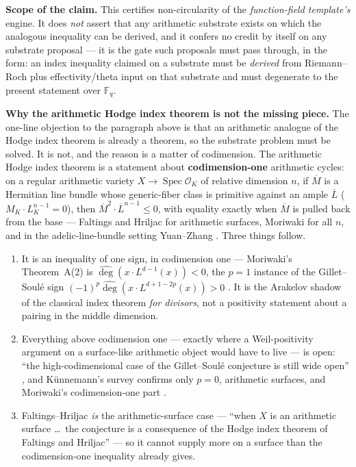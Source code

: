 \documentclass[11pt]{article}
\theoremstyle{definition}
\theoremstyle{remark}
\newcommand{\Fq}{\mathbb{F}_q}
\begin{document}
\medskip

\noindent\textbf{Scope of the claim.} This certifies non-circularity of the
\emph{function-field template's} engine. It does \emph{not} assert that any arithmetic
substrate exists on which the analogous inequality can be derived, and it confers no credit
by itself on any substrate proposal --- it is the gate such proposals must pass through, in
the form: an index inequality claimed on a substrate must be \emph{derived} from
Riemann--Roch plus effectivity/theta input on that substrate and must degenerate to the
present statement over $\Fq$.

\medskip

\noindent\textbf{Why the arithmetic Hodge index theorem is not the missing piece.} The one-line
objection to the paragraph above is that an arithmetic analogue of the Hodge index theorem is
already a theorem, so the substrate problem must be solved. It is not, and the reason is a
matter of codimension. The arithmetic Hodge index theorem is a statement about
\textbf{codimension-one} arithmetic cycles: on a regular arithmetic variety
$X \to \operatorname{Spec} \mathcal{O}_K$ of relative dimension $n$, if $\overline{M}$ is a
Hermitian line bundle whose generic-fiber class is primitive against an ample $\overline{L}$
($M_K \cdot L_K^{n-1} = 0$), then $\overline{M}^2 \cdot \overline{L}^{n-1} \le 0$, with
equality exactly when $\overline{M}$ is pulled back from the base --- Faltings \cite{Faltings}
and Hriljac \cite{Hriljac} for arithmetic surfaces, Moriwaki \cite{Moriwaki} for all $n$, and
in the adelic-line-bundle setting Yuan--Zhang \cite{YuanZhang}. Three things follow.

\begin{enumerate}
\item It is an inequality of one sign, in codimension one --- Moriwaki's Theorem~A(2) is
  $\widehat{\deg}(x \cdot L^{d-1}(x)) < 0$, the $p = 1$ instance of the Gillet--Soul\'e sign
  $(-1)^p \widehat{\deg}(x \cdot L^{d+1-2p}(x)) > 0$ \cite{GilletSoule}. It is the Arakelov
  shadow of the classical index theorem \emph{for divisors}, not a positivity statement about a
  pairing in the middle dimension.
\item Everything above codimension one --- exactly where a Weil-positivity argument on a
  surface-like arithmetic object would have to live --- is open: ``the high-codimensional case of
  the Gillet--Soul\'e conjecture is still wide open'' \cite[p.~2]{YuanZhang}, and K\"unnemann's
  survey confirms only $p = 0$, arithmetic surfaces, and Moriwaki's codimension-one part
  \cite[p.~115]{Kunnemann}.
\item Faltings--Hriljac \emph{is} the arithmetic-surface case --- ``when $X$ is an arithmetic
  surface \ldots\ the conjecture is a consequence of the Hodge index theorem of Faltings and
  Hriljac'' \cite[p.~115]{Kunnemann} --- so it cannot supply more on a surface than the
  codimension-one inequality already gives.
\end{enumerate}
\end{document}
